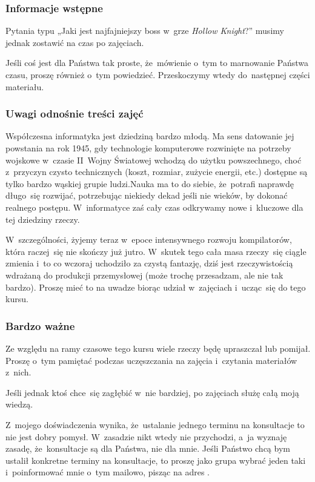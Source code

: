 \documentclass[10pt,t]{beamer}
\begin{document}
\begin{frame}
  \frametitle{Informacje wstępne}


  Pytania typu „Jaki jest najfajniejszy boss w~grze \textit{Hollow
    Knight}?” musimy jednak zostawić na czas po zajęciach.

  Jeśli coś jest dla Państwa tak proste, że~mówienie o~tym to marnowanie
  Państwa czasu, proszę również o~tym powiedzieć. Przeskoczymy wtedy
  do~następnej części materiału.

\end{frame}





\begin{frame}
  \frametitle{Uwagi odnośnie treści zajęć}


  Współczesna informatyka jest dziedziną bardzo młodą. Ma sens datowanie
  jej powstania na rok 1945, gdy technologie komputerowe rozwinięte na
  potrzeby wojskowe w~czasie II~Wojny Światowej wchodzą do użytku
  powszechnego, choć z~przyczyn czysto technicznych (koszt, rozmiar,
  zużycie energii, etc.) dostępne są tylko bardzo wąskiej
  grupie ludzi.Nauka ma to do siebie, że~potrafi naprawdę długo~się
  rozwijać, potrzebując niekiedy dekad jeśli nie wieków, by dokonać
  realnego postępu. W~informatyce zaś cały czas odkrywamy nowe i~kluczowe
  dla tej dziedziny rzeczy.

  W~szczególności, żyjemy teraz w~epoce intensywnego rozwoju kompilatorów,
  która raczej~się nie skończy już jutro. W~skutek tego cała masa rzeczy~się
  ciągle zmienia i~to co wczoraj uchodziło za czystą fantazję, dziś jest
  rzeczywistością wdrażaną do produkcji przemysłowej (może trochę
  przesadzam, ale nie tak bardzo). Proszę mieć to na uwadze biorąc udział
  w~zajęciach i~ucząc~się do tego kursu.

\end{frame}





\begin{frame}
  \frametitle{Bardzo ważne}


  Ze względu na ramy czasowe tego kursu wiele rzeczy będę
  \alert{upraszczał} lub \alert{pomijał}. Proszę o~tym pamiętać podczas
  uczęszczania na zajęcia i~czytania materiałów z~nich.

  Jeśli jednak ktoś chce~się zagłębić w~nie bardziej, po zajęciach służę
  całą moją wiedzą.

  Z~mojego doświadczenia wynika, że~ustalanie jednego terminu na konsultacje
  to nie jest dobry pomysł. W~zasadzie nikt wtedy nie przychodzi, a~ja
  wyznaję zasadę, że~konsultacje są dla Państwa, nie dla mnie. Jeśli
  Państwo chcą bym ustalił konkretne terminy na konsultacje, to proszę jako
  grupa wybrać jeden taki i~poinformować mnie o~tym mailowo, pisząc na
  adres \email.

\end{frame}
\end{document}
